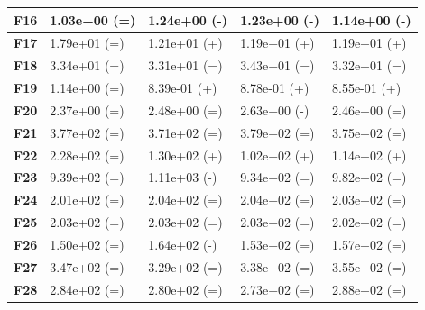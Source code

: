 \documentclass[12pt,a4paper]{report}
\begin{document}
{{{{{{{\begin{table}[h]
\begin{tabular}{|l|l|l|l|l|}
{\bf F16} & 1.03e+00 (=)        & 1.24e+00 (-)     & 1.23e+00 (-)      & 1.14e+00 (-)      \\ \hline
{\bf F17} & 1.79e+01 (=)        & 1.21e+01 (+)     & 1.19e+01 (+)      & 1.19e+01 (+)      \\ \hline
{\bf F18} & 3.34e+01 (=)        & 3.31e+01 (=)     & 3.43e+01 (=)      & 3.32e+01 (=)      \\ \hline
{\bf F19} & 1.14e+00 (=)        & 8.39e-01 (+)     & 8.78e-01 (+)      & 8.55e-01 (+)      \\ \hline
{\bf F20} & 2.37e+00 (=)        & 2.48e+00 (=)     & 2.63e+00 (-)      & 2.46e+00 (=)      \\ \hline
{\bf F21} & 3.77e+02 (=)        & 3.71e+02 (=)     & 3.79e+02 (=)      & 3.75e+02 (=)      \\ \hline
{\bf F22} & 2.28e+02 (=)        & 1.30e+02 (+)     & 1.02e+02 (+)      & 1.14e+02 (+)      \\ \hline
{\bf F23} & 9.39e+02 (=)        & 1.11e+03 (-)     & 9.34e+02 (=)      & 9.82e+02 (=)      \\ \hline
{\bf F24} & 2.01e+02 (=)        & 2.04e+02 (=)     & 2.04e+02 (=)      & 2.03e+02 (=)      \\ \hline
{\bf F25} & 2.03e+02 (=)        & 2.03e+02 (=)     & 2.03e+02 (=)      & 2.02e+02 (=)      \\ \hline
{\bf F26} & 1.50e+02 (=)        & 1.64e+02 (-)     & 1.53e+02 (=)      & 1.57e+02 (=)      \\ \hline
{\bf F27} & 3.47e+02 (=)        & 3.29e+02 (=)     & 3.38e+02 (=)      & 3.55e+02 (=)      \\ \hline
{\bf F28} & 2.84e+02 (=)        & 2.80e+02 (=)     & 2.73e+02 (=)      & 2.88e+02 (=)      \\ \hline
\end{tabular}
\end{table}



}}}}}}}
\end{document}
